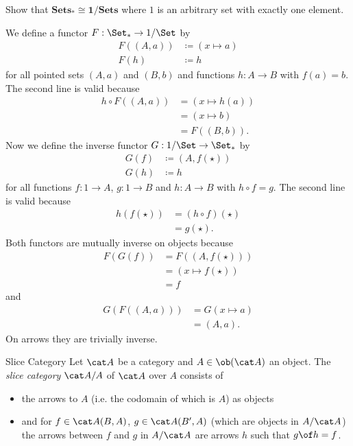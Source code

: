 \begin{exercise}
Show that $\mathbf{Sets_*\cong 1/\mathbf{Sets}}$ where $1$ is an arbitrary set with exactly one element.
\end{exercise}

\begin{answer}
  We define a functor $F : \Set_* \to 1/\Set$ by
  \begin{align*}
    F((A, a)) &\coloneqq (x \mapsto a) \\
    F(h) &\coloneqq h
  \end{align*}
  for all pointed sets $(A, a)$ and $(B, b)$ and functions $h : A \to B$ with $f(a) = b$.
  The second line is valid because
  \[ \begin{split}
    h \circ F((A, a))
    &= (x \mapsto h(a)) \\
    &= (x \mapsto b) \\
    &= F((B, b)).
  \end{split} \]
  Now we define the inverse functor $G : 1/\Set \to \Set_*$ by
  \begin{align*}
    G(f) &\coloneqq (A, f(\star)) \\
    G(h) &\coloneqq h
  \end{align*}
  for all functions $f : 1 \to A$, $g : 1 \to B$ and $h : A \to B$ with $h \circ f = g$.
  The second line is valid because
  \[ \begin{split}
    h(f(\star))
    &= (h \circ f)(\star) \\
    &= g(\star).
  \end{split} \]
  Both functors are mutually inverse on objects because
  \[ \begin{split}
    F(G(f))
    &= F((A, f(\star))) \\
    &= (x \mapsto f(\star)) \\
    &= f
  \end{split} \]
  and
  \[ \begin{split}
    G(F((A, a)))
    &= G(x \mapsto a) \\
    &= (A, a).
  \end{split} \]
  On arrows they are trivially inverse.
\end{answer}

\begin{definition}{Slice Category}
  Let $\A$ be a category and $A\in\ob(\A)$ an object. The \emph{slice category} $\A/A$ of $\A$ over $A$ consists of
  \begin{itemize}
  \item the arrows to $A$ (i.e. the codomain of which is $A$) as objects
  \item and for $f\in \A(B,A)$, $g\in\A(B',A)$ (which are objects in $A/\A$) the arrows between $f$ and $g$ in $A/\A$ are arrows $h$ such that $g\of h=f$.
  \end{itemize}
\end{definition}

